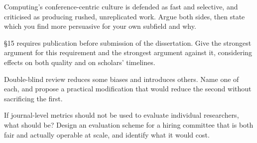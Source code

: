 \begin{reviewq}
  \item Computing's conference-centric culture is defended as fast and
    selective, and criticised as producing rushed, unreplicated work. Argue
    both sides, then state which you find more persuasive for your own
    subfield and why.
  \item \S15 requires publication before submission of the dissertation. Give
    the strongest argument for this requirement and the strongest argument
    against it, considering effects on both quality and on scholars' timelines.
  \item Double-blind review reduces some biases and introduces others. Name one
    of each, and propose a practical modification that would reduce the second
    without sacrificing the first.
  \item If journal-level metrics should not be used to evaluate individual
    researchers, what should be? Design an evaluation scheme for a hiring
    committee that is both fair and actually operable at scale, and identify
    what it would cost.
\end{reviewq}
